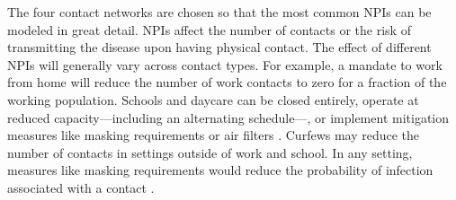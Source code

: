 The four contact networks are chosen so that the most common NPIs can be modeled in
great detail. NPIs affect the number of contacts or the risk of transmitting the disease
upon having physical contact. The effect of different NPIs will generally vary across
contact types. For example, a mandate to work from home will reduce the number of work
contacts to zero for a fraction of the working population. Schools and daycare can be
closed entirely, operate at reduced capacity---including an alternating schedule---, or
implement mitigation measures like masking requirements or air filters
\citep{Lessler2021}. Curfews may reduce the number of contacts in settings outside of
work and school. In any setting, measures like masking requirements would reduce the
probability of infection associated with a contact \citep{Cheng2021}.

